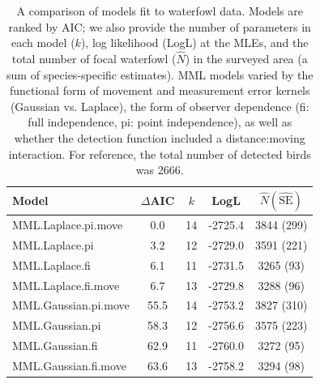 \documentclass[aoas,preprint]{imsart}
\numberwithin{equation}{section}
\theoremstyle{plain}
\begin{document}
\begin{table}[ht]
\caption{A comparison of models fit to waterfowl data.  Models are ranked by AIC; we also provide the number of parameters in each model ($k$), log likelihood (LogL) at the MLEs, and the total number of focal waterfowl ($\hat{N}$) in the surveyed area (a sum of species-specific estimates).  MML models varied by the functional form of movement and measurement error kernels (Gaussian vs. Laplace), the form of observer dependence (fi: full independence, pi: point independence),  as well as whether the detection function included a distance:moving interaction.  For reference, the total number of detected birds was 2666.
}
\label{tab:ests}
\raggedright
\begin{tabular}{lcccc}
  \hline
  Model & $\Delta$AIC & $k$ & LogL & $\hat{N}(\hat{\textrm{SE}})$  \\
  \hline
  MML.Laplace.pi.move & 0.0 & 14 & -2725.4 & 3844 (299) \\
  MML.Laplace.pi & 3.2 & 12 & -2729.0 & 3591 (221) \\
  MML.Laplace.fi & 6.1 & 11 & -2731.5 & 3265 (93) \\
  MML.Laplace.fi.move & 6.7 & 13 & -2729.8 & 3288 (96) \\
  MML.Gaussian.pi.move & 55.5 & 14 & -2753.2 & 3827 (310) \\
  MML.Gaussian.pi & 58.3 & 12 & -2756.6 & 3575 (223) \\
  MML.Gaussian.fi & 62.9 & 11 & -2760.0 & 3272 (95) \\
  MML.Gaussian.fi.move & 63.6 & 13 & -2758.2 & 3294 (98) \\
\hline
\end{tabular}
\end{table}
\end{document}
